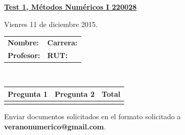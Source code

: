 \documentclass[11pt]{article}
\begin{document}
\hspace*{-1,5cm}

\vspace*{0.5cm} \centerline {\bf\underline{Test 1, M\'etodos Num\'ericos I 220028 }}
\centerline{\textrm{Vienres 11 de diciembre 2015.}}  \vspace{0.2cm}


\begin{center}
 \begin{tabular}{p{}p{}}
	\textbf{Nombre:}   &\textbf{Carrera:}\\
	\textbf{Profesor:} & \textbf{ RUT:}
 \end{tabular}
 \\
 \vspace{0.2cm}
 \begin{tabular}{||p{2cm}|p{2cm}||p{2cm}||}
 \hline
 Pregunta 1 &  Pregunta 2  &     Total\\
 \hline

  \vspace{1.5cm} & &     \\
 \hline
 \end{tabular}
 \end{center}
 Enviar documentos solicitados en el formato solicitado a \textbf{veranonumerico@gmail.com}.
\end{document}
